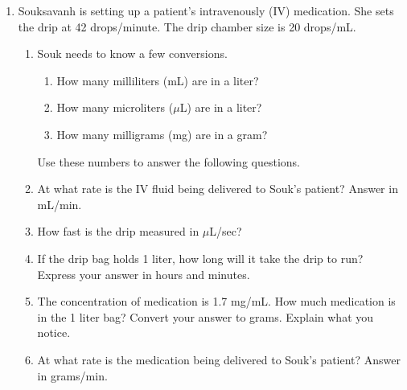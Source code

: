 \begin{enumerate}

\item Souksavanh is setting up a patient's intravenously (IV) medication. She sets the drip at 42 drops/minute.  The drip chamber size is 20 drops/mL.  
\begin{enumerate}
\item Souk needs to know a few conversions.
\begin{enumerate}
\item How many milliliters (mL) are in a liter? \bigskip
\item How many microliters ($\mu$L) are in a liter? \bigskip
\item How many milligrams (mg) are in a gram? \bigskip
\end{enumerate}
\hspace{-.35in}  Use these numbers to answer the following questions. %
\item At what rate is the IV fluid being delivered to Souk's patient?  Answer in mL/min. \vfill
\item How fast is the drip measured in $\mu$L/sec? \vfill
\item If the drip bag holds 1 liter, how long will it take the drip to run?  Express your answer in hours and minutes.\vfill
\item The concentration of medication is 1.7 mg/mL.  How much medication is in the 1 liter bag?  Convert your answer to grams.  Explain what you notice.\vfill
\item At what rate is the medication being delivered to Souk's patient?  Answer in grams/min.\vfill
\end{enumerate}

\newpage %


\end{enumerate}
